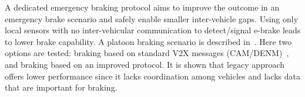 A dedicated emergency braking protocol aims to improve the outcome in an emergency brake scenario and safely enable smaller inter-vehicle gaps. Using only local sensors with no inter-vehicular communication to detect/signal e-brake leads to lower brake capability. A platoon braking scenario is described in~\cite{bergenhem2015}. Here two options are tested: braking based on standard V2X messages (CAM/DENM)~\cite{EN3026372,EN3026373}, and braking based on an improved protocol. It is shown that legacy approach offers lower performance since it lacks coordination among vehicles and lacks data that are important for braking. %


